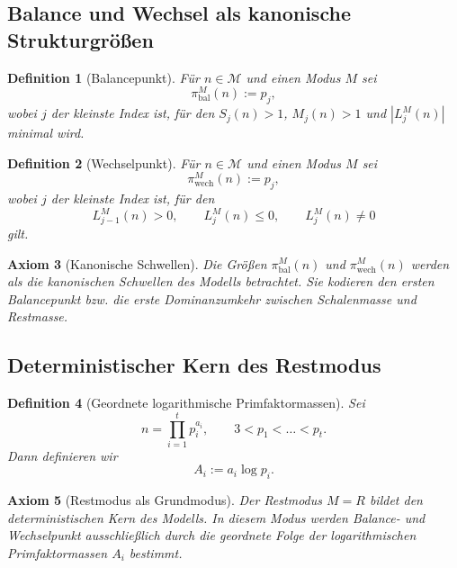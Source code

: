 \documentclass[11pt,a4paper]{article}
\newtheorem{definition}{Definition}[section]
\newtheorem{axiom}[definition]{Axiom}
\begin{document}
	\subsection{Balance und Wechsel als kanonische Strukturgrößen}
	
	\begin{definition}[Balancepunkt]
		\label{def:modell_bal}
		Für \(n\in\mathcal M\) und einen Modus \(M\) sei
		\[
		\pi_{\text{bal}}^M(n):=p_j,
		\]
		wobei \(j\) der kleinste Index ist, für den \(S_j(n)>1\), \(M_j(n)>1\) und \(|L_j^M(n)|\) minimal wird.
	\end{definition}
	
	\begin{definition}[Wechselpunkt]
		\label{def:modell_wech}
		Für \(n\in\mathcal M\) und einen Modus \(M\) sei
		\[
		\pi_{\text{wech}}^M(n):=p_j,
		\]
		wobei \(j\) der kleinste Index ist, für den
		\[
		L_{j-1}^M(n)>0,\qquad L_j^M(n)\le 0,\qquad L_j^M(n)\neq 0
		\]
		gilt.
	\end{definition}
	
	\begin{axiom}[Kanonische Schwellen]
		\label{ax:kanonische_schwellen}
		Die Größen \(\pi_{\text{bal}}^M(n)\) und \(\pi_{\text{wech}}^M(n)\) werden als die kanonischen Schwellen des Modells betrachtet. Sie kodieren den ersten Balancepunkt bzw. die erste Dominanzumkehr zwischen Schalenmasse und Restmasse.
	\end{axiom}
	
	\subsection{Deterministischer Kern des Restmodus}
	
	\begin{definition}[Geordnete logarithmische Primfaktormassen]
		\label{def:modell_ai}
		Sei
		\[
		n=\prod_{i=1}^t p_i^{a_i},
		\qquad
		3<p_1<\dots<p_t.
		\]
		Dann definieren wir
		\[
		A_i:=a_i\log p_i.
		\]
	\end{definition}
	
	\begin{axiom}[Restmodus als Grundmodus]
		\label{ax:restmodus}
		Der Restmodus \(M=R\) bildet den deterministischen Kern des Modells. In diesem Modus werden Balance- und Wechselpunkt ausschließlich durch die geordnete Folge der logarithmischen Primfaktormassen \(A_i\) bestimmt.
	\end{axiom}
	
\end{document}
